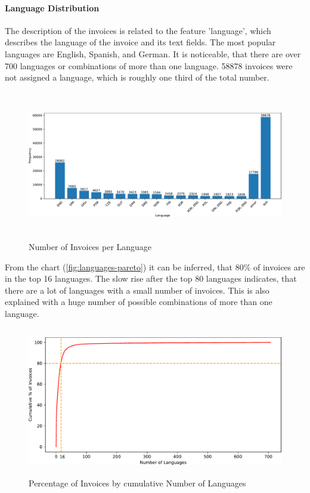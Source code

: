 \paragraph{Language Distribution}
The description of the invoices is related to the feature 'language', which describes the language of the invoice and its text fields. The most popular languages are English, Spanish, and German. It is noticeable, that there are over 700 languages or combinations of more than one language. 58878 invoices were not assigned a language, which is roughly one third of the total number.
\begin{figure}[h!]
	\centering
	\includegraphics[height=6.5cm]{Bilder/languages.pdf}
	\caption{Number of Invoices per Language}
	\label{fig:languages-bar}
\end{figure}
From the chart (\ref{fig:languages-pareto}) it can be inferred, that 80\% of invoices are in the top 16 languages. The slow rise after the top 80 languages indicates, that there are a lot of languages with a small number of invoices. This is also explained with a huge number of possible combinations of more than one language.
\newpage
\begin{figure}[!h]
	\centering
	\includegraphics[height=6.5cm]{Bilder/languages_pareto.pdf}
	\caption{Percentage of Invoices by cumulative Number of Languages}
	\label{fig:languages-bar}
\end{figure}

